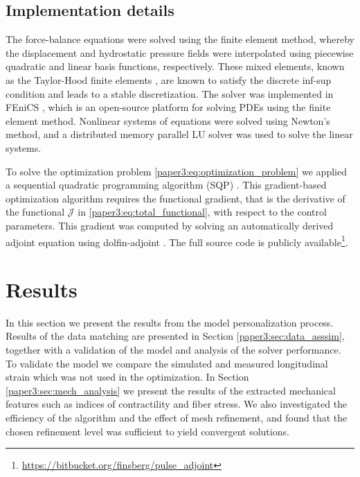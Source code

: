 \subsection{Implementation details}
The force-balance equations were solved using the finite element
method, whereby the displacement and hydrostatic pressure fields were
interpolated using piecewise quadratic and linear basis functions,
respectively. These mixed elements, known as the Taylor-Hood finite
elements \citep{hood1974navier}, are known to satisfy the discrete
inf-sup condition \citep{chapelle1993inf} and leads to a stable
discretization. The solver was implemented in FEniCS
\citep{logg2012automated}, which is an open-source platform for
solving PDEs using the finite element method. Nonlinear systems of
equations were solved using Newton's method,
and a distributed memory parallel LU solver\citep{li2003superlu_dist}
was used to solve the linear systems.


To solve the optimization problem \eqref{paper3:eq:optimization_problem} we
applied a sequential quadratic programming algorithm (SQP)
\citep{kraft1988software}. This gradient-based optimization
algorithm requires the functional gradient, that is the derivative
of the functional $\mathcal{J}$ in \eqref{paper3:eq:total_functional}, with
respect to the control parameters. This gradient was
computed by solving an automatically derived adjoint equation using
dolfin-adjoint \citep{farrell2013automated}.
The full source code is publicly
  available\footnote{\url{https://bitbucket.org/finsberg/pulse_adjoint}}. 

\section{Results}
\label{paper3:sec:results}
In this section we present the results from the model personalization
process. Results of the data matching are 
presented in Section \ref{paper3:sec:data_asssim}, together with a validation of the
model and analysis of the solver performance. To validate the model we compare the
simulated and measured longitudinal strain which was not used in the
optimization. In Section \ref{paper3:sec:mech_analysis} we present the results of the
extracted mechanical features such as indices of contractility and
fiber stress.  We also investigated the efficiency of the algorithm and the effect of mesh refinement, and
found that the chosen refinement level was sufficient to yield
convergent solutions.

